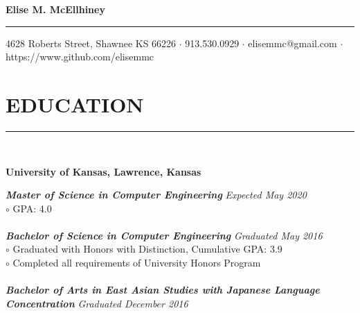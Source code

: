 \documentclass[twoside]{article}
\begin{document}
\begingroup
	\fontsize{20pt}{12pt}\selectfont
	\textbf{Elise M. McEllhiney}\\
\endgroup
\rule{\textwidth}{1.5pt}
\begin{center}
\vspace{-0.6em}
\small{4628 Roberts Street, Shawnee KS 66226 $\cdot$ 913.530.0929 $\cdot$ elisemmc@gmail.com $\cdot$ https://www.github.com/elisemmc}
\end{center}

\fontsize{9pt}{10.5pt}\selectfont

\section*{EDUCATION}
\vspace{-1em}
\rule{\textwidth}{1pt}\\
\begin{adjustwidth}{0.2in}{0in}
\vspace{-1em}
\textbf{University of Kansas, Lawrence, Kansas}\\
\end{adjustwidth}
\begin{adjustwidth}{0.4in}{0in}
\vspace{-1em}
\textbf{\emph{Master of Science in Computer Engineering}} \hfill \textit{Expected May 2020}\\
$\circ$ GPA: 4.0\\\\
\textbf{\emph{Bachelor of Science in Computer Engineering}} \hfill \textit{Graduated May 2016}\\
$\circ$ Graduated with Honors with Distinction, Cumulative GPA: 3.9\\
$\circ$ Completed all requirements of University Honors Program\\\\
\textbf{\emph{Bachelor of Arts in East Asian Studies with Japanese Language Concentration}} \hfill \textit{Graduated December 2016}\\
\end{adjustwidth}
\end{document}
